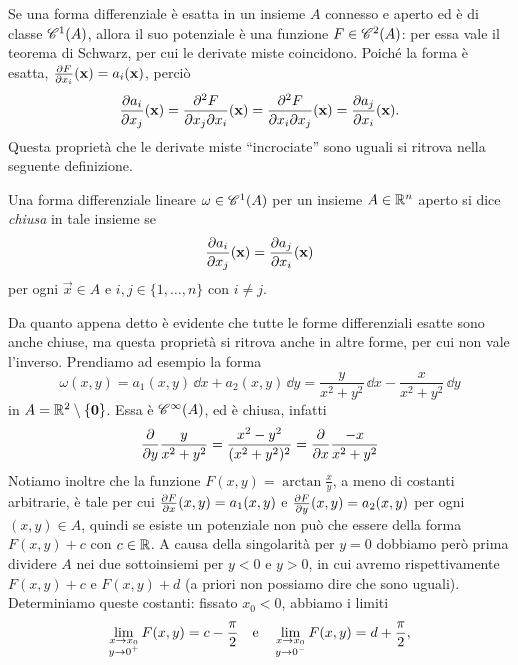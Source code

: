 Se una forma differenziale è esatta in un insieme $A$ connesso e aperto ed è di classe $\cont[1]{A}$, allora il suo potenziale è una funzione $F\in\cont[2]{A}$: per essa vale il teorema di Schwarz, per cui le derivate miste coincidono.
Poiché la forma è esatta, $\drp{F}{x_i}(\vec x)=a_i(\vec x)$, perciò
\begin{equation}
	\drp{a_i}{x_j}(\vec x)=\frac{\partial^2 F}{\partial x_j\partial x_i}(\vec x)=\frac{\partial^2 F}{\partial x_i\partial x_j}(\vec x)=\drp{a_j}{x_i}(\vec x).
\end{equation}
Questa proprietà che le derivate miste ``incrociate'' sono uguali si ritrova nella seguente definizione.
\begin{definizione} \label{d:forma-diff-chiusa}
	Una forma differenziale lineare $\omega\in\cont[1]{A}$ per un insieme $A\in\R^n$ aperto si dice \emph{chiusa} in tale insieme se
	\begin{equation}
		\drp{a_i}{x_j}(\vec x)=\drp{a_j}{x_i}(\vec x)
	\end{equation}
	per ogni $\vec x\in A$ e $i,j\in\{1,\dots,n\}$ con $i\neq j$.
\end{definizione}
Da quanto appena detto è evidente che tutte le forme differenziali esatte sono anche chiuse, ma questa proprietà si ritrova anche in altre forme, per cui non vale l'inverso.
Prendiamo ad esempio la forma
\begin{equation*}
	\omega(x,y)=a_1(x,y)\,\dd x+a_2(x,y)\,\dd y=\frac{y}{x^2+y^2}\,\dd x-\frac{x}{x^2+y^2}\,\dd y
\end{equation*}
in $A=\R^2\setminus\{\vec 0\}$.
Essa è $\cont[\infty]{A}$, ed è chiusa, infatti
\begin{equation}
	\drp{}{y}\frac{y}{x^2+y^2}=\frac{x^2-y^2}{(x^2+y^2)^2}=\drp{}{x}\frac{-x}{x^2+y^2}
\end{equation}
Notiamo inoltre che la funzione $F(x,y)=\arctan\frac{x}{y}$, a meno di costanti arbitrarie, è tale per cui $\drp{F}{x}(x,y)=a_1(x,y)$ e $\drp{F}{y}(x,y)=a_2(x,y)$ per ogni $(x,y)\in A$, quindi se esiste un potenziale non può che essere della forma $F(x,y)+c$ con $c\in\R$.
A causa della singolarità per $y=0$ dobbiamo però prima dividere $A$ nei due sottoinsiemi per $y<0$ e $y>0$, in cui avremo rispettivamente $F(x,y)+c$ e $F(x,y)+d$ (a priori non possiamo dire che sono uguali).
Determiniamo queste costanti: fissato $x_0<0$, abbiamo i limiti
\begin{equation}
	\lim_{\substack{x\to x_0\\ y\to 0^+}}F(x,y)=c-\frac{\pi}2\qtext{e}\lim_{\substack{x\to x_0\\ y\to 0^-}}F(x,y)=d+\frac{\pi}2,
\end{equation}
